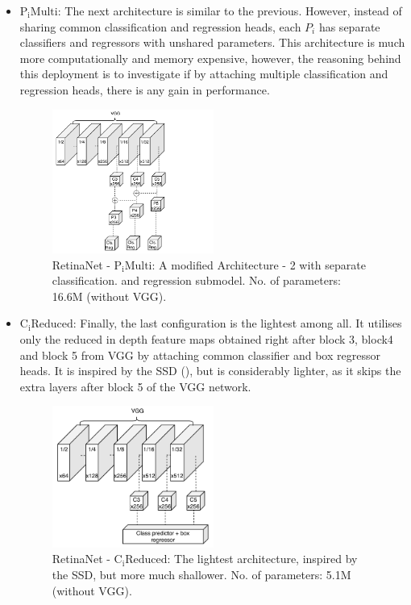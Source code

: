 \begin{itemize}
 \item{\textbf{$\text{P}_\text{i}\text{Multi}$}:}\label{arch_3}
The next architecture is similar to the previous. However, instead of sharing common classification and regression heads, each $P_i$ has separate classifiers and regressors with unshared parameters. This architecture is much more computationally and memory expensive, however, the reasoning behind this deployment is to investigate if by attaching multiple classification and regression heads, there is any gain in performance.

\begin{figure}[!htb]
  \centering
  \includegraphics[width=0.5\textwidth]{figures/ch3/fig5.pdf}
  \caption{RetinaNet - $\text{P}_\text{i}\text{Multi}$: A modified Architecture - 2 with separate classification. and regression submodel. No. of parameters: 16.6M (without VGG).}
  \label{fig5}
\end{figure} 

 \item{\textbf{$\text{C}_\text{i}\text{Reduced}$}:} 
Finally, the last configuration is the lightest among all. It utilises only the reduced in depth feature maps obtained right after block 3, block4 and block 5 from VGG by attaching common classifier and box regressor heads. It is inspired by the SSD (\cite{liu2016ssd}), but is considerably lighter, as it skips the extra layers after block 5 of the VGG network.

\begin{figure}[!htb]
  \centering
  \includegraphics[width=0.5\textwidth]{figures/ch3/fig6.pdf}
  \caption{RetinaNet - $\text{C}_\text{i}\text{Reduced}$: The lightest architecture, inspired by the SSD, but more much shallower. No. of parameters: 5.1M (without VGG).}
  \label{fig6}
\end{figure} 

\end{itemize}

